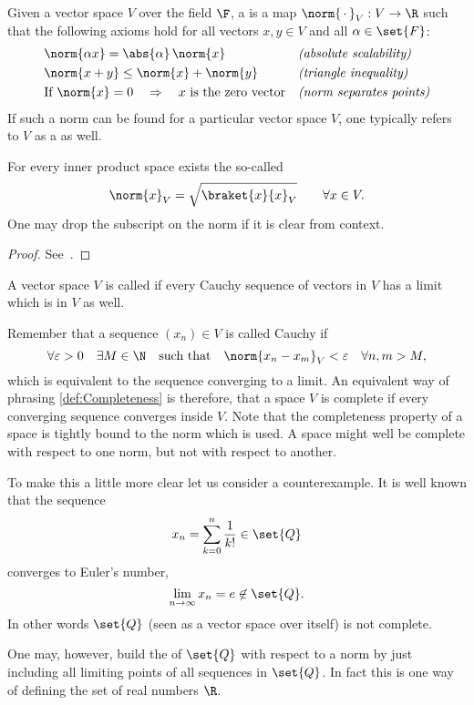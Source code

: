 \begin{defn}
	Given a vector space $V$ over the field $\F$, a  is a map
	$\norm{\slot}_V : V \to \R$
	such that the following axioms hold for all vectors $x,y \in V$ and all $\alpha \in \set{F}$:
	\begin{align}
		\label{eqn:normScalability}
			&\norm{\alpha x} = \abs{\alpha} \, \norm{x} &&
			\text{\textit{(absolute scalability)}} \\
		\label{eqn:normTriaIneq}
			&\norm{x + y} \le \norm{x} + \norm{y} &&
			\text{\textit{(triangle inequality)}} \\
		\label{eqn:normPointSep}
			&\text{If}~\norm{x} = 0 \quad \Rightarrow
			\quad \text{$x$ is the zero vector} &&
			\text{\textit{(norm separates points)}}
	\end{align}
	If such a norm can be found for a particular vector space $V$,
	one typically refers to $V$ as a  as well.
\end{defn}

\begin{prop}
	For every inner product space exists the so-called 
	\begin{equation}
		\norm{x}_V = \sqrt{ \braket{x}{x}_V } \qquad \forall x \in V.
		\label{eqn:normInduced}
	\end{equation}
	One may drop the subscript on the norm
	if it is clear from context.
	\begin{proof}
		See~\cite{DiracNotation}.
	\end{proof}
\end{prop}

\begin{defn}
	\label{def:Completeness}
	A vector space $V$ is called  if every Cauchy sequence
	of vectors in  $V$ has a limit which is in $V$ as well.
\end{defn}
Remember that a sequence $(x_n) \in V$ is called Cauchy if
\[ \forall \varepsilon > 0 \quad
	\exists M \in \N \quad \text{such that} \quad
	\norm{x_n - x_m}_V < \varepsilon \quad \forall n,m > M,
\]
which is equivalent to the sequence converging to a limit.
An equivalent way of phrasing  \vref{def:Completeness}
is therefore,
that a space $V$ is complete if every converging sequence
converges inside $V$.
Note that the completeness property of a space is
tightly bound to the norm which is used.
A space might well be complete with respect to one norm,
but not with respect to another.

\begin{exmp}
	To make this a little more clear let us consider a counterexample.
	It is well known that the sequence
	\[ x_n = \sum_{k=0}^n \frac{1}{k!} \in \set{Q} \]
	converges to Euler's number, \ie
	\[ \lim_{n\to\infty} x_n = e \not\in \set{Q}. \]
	In other words $\set{Q}$ (seen as a vector space over itself)
	is not complete.

	One may, however, build the  of $\set{Q}$
	with respect to a norm by just including all limiting points of
	all sequences in $\set{Q}$. In fact this is one way
	of defining the set of real numbers $\R$.
\end{exmp}

